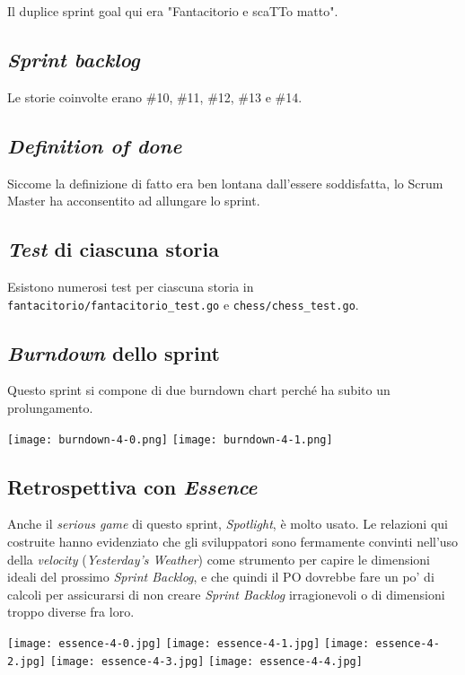 \documentclass{article}
\begin{document}
Il duplice sprint goal qui era "Fantacitorio e scaTTo matto".

\subsection{\emph{Sprint backlog}}

Le storie coinvolte erano \#10, \#11, \#12, \#13 e \#14.

\subsection{\emph{Definition of done}}

Siccome la definizione di fatto era ben lontana dall'essere soddisfatta, lo
Scrum Master ha acconsentito ad allungare lo sprint.

\subsection{\emph{Test} di ciascuna storia}

Esistono numerosi test per ciascuna storia in
\verb!fantacitorio/fantacitorio_test.go! e \verb!chess/chess_test.go!.

\subsection{\emph{Burndown} dello sprint}

Questo sprint si compone di due burndown chart perché ha subito un
prolungamento.

\texttt{[image: burndown-4-0.png]}
\texttt{[image: burndown-4-1.png]}

\subsection{Retrospettiva con \emph{Essence}}

Anche il \emph{serious game} di questo sprint, \emph{Spotlight}, è molto usato.
Le relazioni qui costruite hanno evidenziato che gli sviluppatori sono
fermamente convinti nell'uso della \emph{velocity} (\emph{Yesterday's Weather})
come strumento per capire le dimensioni ideali del prossimo \emph{Sprint
	Backlog}, e che quindi il PO dovrebbe fare un po' di calcoli per assicurarsi di
non creare \emph{Sprint Backlog} irragionevoli o di dimensioni troppo diverse
fra loro.

\texttt{[image: essence-4-0.jpg]}
\texttt{[image: essence-4-1.jpg]}
\texttt{[image: essence-4-2.jpg]}
\texttt{[image: essence-4-3.jpg]}
\texttt{[image: essence-4-4.jpg]}
\end{document}
